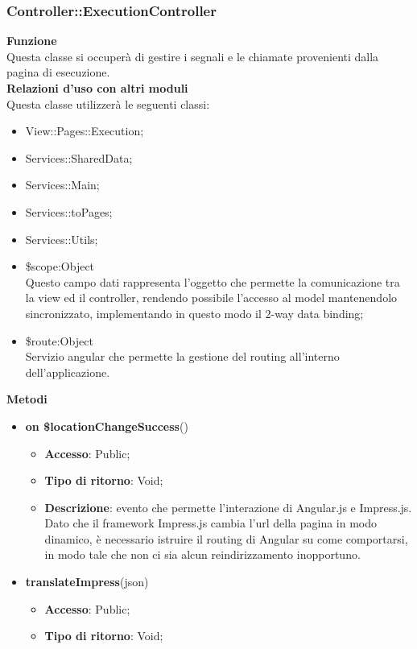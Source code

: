 {	\subsubsection{Controller::\-ExecutionController}{
		\textbf{Funzione}\\
		\indent Questa classe si occuperà di gestire i segnali e le chiamate provenienti dalla pagina di esecuzione.\\
		\textbf{Relazioni d'uso con altri moduli}\\
		\indent Questa classe utilizzerà le seguenti classi:
		\begin{itemize}
			\item View::\-Pages::\-Execution;
			\item Services::\-SharedData;
			\item Services::\-Main;
			\item Services::\-toPages;
			\item Services::\-Utils;
			\item \$scope:Object\\
				\indent Questo campo dati rappresenta l’oggetto che permette la comunicazione tra la view ed il controller, rendendo possibile l’accesso al model mantenendolo sincronizzato, implementando in questo modo il 2-way data binding;
			\item \$route:Object\\
				\indent Servizio angular che permette la gestione del routing all'interno dell'applicazione.
		\end{itemize}
		\textbf{Metodi}
		\begin{itemize}
			\item \textbf{on \$locationChangeSuccess}()
			\begin{itemize}
				\item \textbf{Accesso}: Public;
				\item \textbf{Tipo di ritorno}: Void;
				\item \textbf{Descrizione}: evento che permette l'interazione di Angular.js e Impress.js. Dato che il framework Impress.js cambia l'url della pagina in modo dinamico, è necessario istruire il routing di Angular su come comportarsi, in modo tale che non ci sia alcun reindirizzamento inopportuno.
			\end{itemize}
			\item \textbf{translateImpress}(json)
			\begin{itemize}
				\item \textbf{Accesso}: Public;
				\item \textbf{Tipo di ritorno}: Void;

\end{itemize}
\end{itemize}}}
